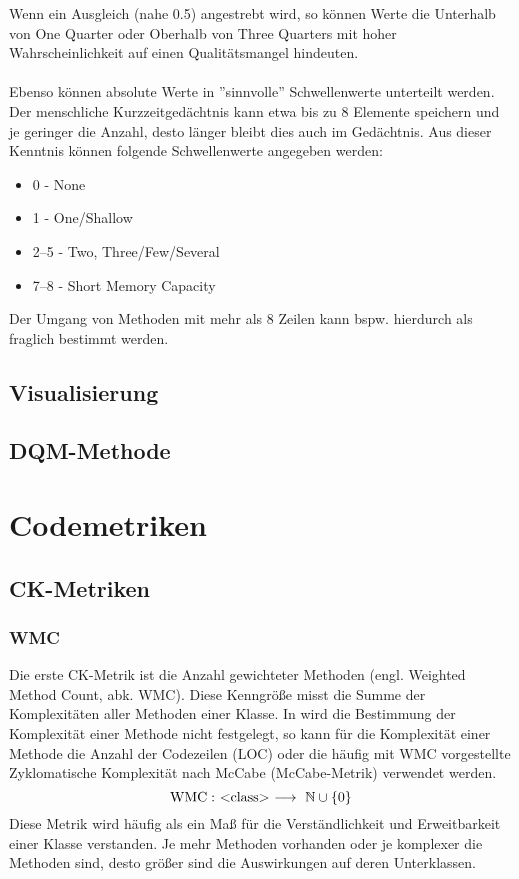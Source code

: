 \documentclass[12pt]{article}
\newcommand{\type}[1]{<\negthickspace\text{#1}\negthickspace> }
\begin{document}
Wenn ein Ausgleich (nahe 0.5) angestrebt wird, so können Werte
die Unterhalb von One Quarter oder Oberhalb von Three Quarters
mit hoher Wahrscheinlichkeit auf einen Qualitätsmangel hindeuten.
\\
\\
Ebenso können absolute Werte in ''sinnvolle'' Schwellenwerte
unterteilt werden. Der menschliche Kurzzeitgedächtnis kann etwa
bis zu 8 Elemente speichern und je geringer die Anzahl, desto
länger bleibt dies auch im Gedächtnis. Aus dieser Kenntnis können
folgende Schwellenwerte angegeben werden:
\begin{itemize}
        \item 0 - None
        \item 1 - One/Shallow
        \item 2--5 - Two, Three/Few/Several
        \item 7--8 - Short Memory Capacity
\end{itemize}
Der Umgang von Methoden mit mehr als 8 Zeilen kann bspw.
hierdurch als fraglich bestimmt werden.

\subsection{Visualisierung}

\subsection{DQM-Methode}

\section{Codemetriken}\label{codem}

\subsection{CK-Metriken}

\subsubsection{WMC}

Die erste CK-Metrik ist die Anzahl gewichteter Methoden
(engl. Weighted Method Count, abk. WMC). Diese Kenngröße
misst die Summe der Komplexitäten aller Methoden einer Klasse.
In \cite{chi94} wird die Bestimmung der Komplexität einer Methode
nicht festgelegt, so kann für die Komplexität einer Methode die
Anzahl der Codezeilen (LOC) oder die häufig mit WMC vorgestellte
Zyklomatische Komplexität nach McCabe (McCabe-Metrik) verwendet werden.
\[
        \text{WMC}: ~ 
        \type{class}
        ~ \longrightarrow ~ \mathbb{N}  \cup \left\{ 0 \right\} 
\]
Diese Metrik wird häufig als ein Maß für die Verständlichkeit und
Erweitbarkeit einer Klasse verstanden. Je mehr Methoden vorhanden
oder je komplexer die Methoden sind, desto größer sind die
Auswirkungen auf deren Unterklassen.
\end{document}
